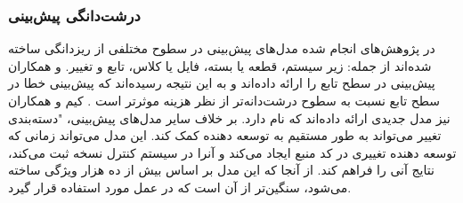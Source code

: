 \subsubsection{درشت‌دانگی پیش‌بینی }
در پژوهش‌های انجام شده مدل‌های پیش‌بینی در سطوح مختلفی از ریزدانگی ساخته شده‌اند از جمله: زیر سیستم، قطعه یا بسته، فایل یا کلاس، تابع و تغییر.  و همکاران  پیش‌بینی در سطح تابع را ارائه داده‌اند و به این نتیجه رسیده‌اند که پیش‌بینی خطا در سطح تابع نسبت به سطوح درشت‌دانه‌تر از نظر هزینه موثرتر است \cite{hata2012bug}. کیم و همکاران نیز مدل جدیدی ارائه داده‌اند که  نام دارد. بر خلاف سایر مدل‌های پیش‌بینی، "دسته‌بندی تغییر می‌تواند به طور مستقیم به توسعه دهنده کمک کند. این مدل می‌تواند زمانی که توسعه دهنده تغییری در کد منبع ایجاد می‌کند و آنرا در سیستم کنترل نسخه ثبت می‌کند، نتایج آنی را فراهم کند.  از آنجا که این مدل بر اساس بیش از ده هزار ویژگی ساخته می‌شود، سنگین‌تر از آن است که در عمل مورد استفاده قرار گیرد\cite{kim2008classifying}. \\


